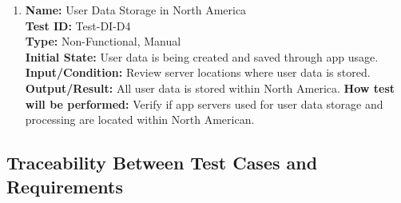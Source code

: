 \documentclass[12pt, titlepage]{article}
\begin{document}
\begin{enumerate}
  \item \textbf{Name:} User Data Storage in North America \label{itm:Test-DI-D4} \\
    \textbf{Test ID:} Test-DI-D4 \\
    \textbf{Type:} Non-Functional, Manual \\
    \textbf{Initial State:} User data is being created and saved through app usage. \\
    \textbf{Input/Condition:} Review server locations where user data is stored. \\
    \textbf{Output/Result:} All user data is stored within North America.
    \textbf{How test will be performed:} Verify if app servers used for user data storage and processing are located within North American. \\

\end{enumerate}

\subsection{Traceability Between Test Cases and Requirements}
\end{document}
